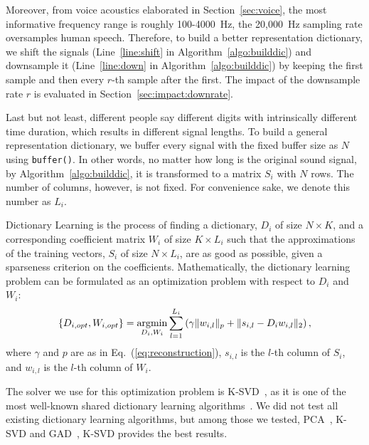  

 Moreover, from voice acoustics elaborated in Section~\ref{sec:voice}, the most informative frequency range is roughly 100-4000~Hz, the 20,000~Hz sampling rate oversamples human speech. Therefore, to build a better representation dictionary, we shift the signals (Line~\ref{line:shift} in Algorithm~\ref{algo:builddic}) and downsample it (Line~\ref{line:down} in Algorithm~\ref{algo:builddic}) by keeping the first sample and then every $r$-th sample after the first. The impact of the downsample rate $r$ is evaluated in Section~\ref{sec:impact:downrate}.

Last but not least, different people say different digits with intrinsically different time duration, which results in different signal lengths. To build a general representation dictionary, we buffer every signal with the fixed buffer size as $N$ using \verb|buffer()|. In other words, no matter how long is the original sound signal, by Algorithm~\ref{algo:builddic}, it is transformed to a matrix $S_i$ with $N$ rows. The number of columns, however, is not fixed. For convenience sake, we denote this number as $L_i$.




 
Dictionary Learning is the process of finding a dictionary, $D_i$ of size $N \times K$, and a corresponding coefficient matrix $W_i$ of size $K \times L_i$ such that the approximations of the training vectors, $S_i$ of size $N \times L_i$, are as good as possible, given a sparseness criterion on the coefficients. Mathematically, the dictionary learning problem can be formulated as an optimization problem with respect to $D_i$ and $W_i$:
\begin{displaymath}
	\left\lbrace 
	D_{i, opt},
	W_{i, opt}
	\right\rbrace 
	=
	\operatorname*{argmin}_{D_i, W_i}
	\sum_{l=1}^{L_i}
	\left( 
	\gamma
	\Vert w_{i, l} \Vert_p
	+
	\Vert s_{i,l} - D_i w_{i, l} \Vert_2
	\right) 
	,
\end{displaymath}
where $\gamma$ and $p$ are as in Eq.~(\ref{eq:reconstruction}), $s_{i, l}$ is the $l$-th column of $S_i$, and $w_{i, l}$ is the $l$-th column of $W_i$. 




The solver we use for this optimization problem is K-SVD~\cite{aharon2006k}, as it is one of the most well-known shared dictionary learning algorithms~\cite{xu2017survey}. We did not test all existing dictionary learning algorithms, but among those we tested, PCA~\cite{haykin2007neural}, K-SVD  and GAD~\cite{jafari2011fast}, K-SVD provides the best results. 




